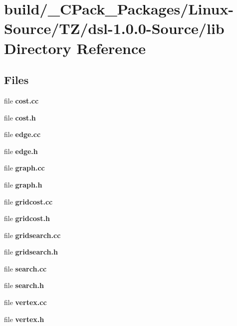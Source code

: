 \section{build/\-\_\-\-C\-Pack\-\_\-\-Packages/\-Linux-\/\-Source/\-T\-Z/dsl-\/1.0.0-\/\-Source/lib Directory Reference}
\label{dir_cc08c81ba97a1ca3bdcdd2987fbc3272}
\subsection*{Files}
\begin{DoxyCompactItemize}
\item 
file {\bf cost.\-cc}
\item 
file {\bf cost.\-h}
\item 
file {\bf edge.\-cc}
\item 
file {\bf edge.\-h}
\item 
file {\bf graph.\-cc}
\item 
file {\bf graph.\-h}
\item 
file {\bf gridcost.\-cc}
\item 
file {\bf gridcost.\-h}
\item 
file {\bf gridsearch.\-cc}
\item 
file {\bf gridsearch.\-h}
\item 
file {\bf search.\-cc}
\item 
file {\bf search.\-h}
\item 
file {\bf vertex.\-cc}
\item 
file {\bf vertex.\-h}
\end{DoxyCompactItemize}
